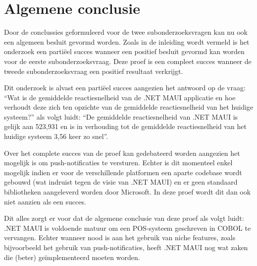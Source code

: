 \section{Algemene conclusie}
Door de conclussies geformuleerd voor de twee subonderzoeksvragen kan nu ook een algemeen besluit gevormd worden. Zoals in de inleiding wordt vermeld is het onderzoek een partiëel succes wanneer een positief besluit gevormd kan worden voor de eerste subonderzoeksvraag. Deze proef is een compleet succes wanneer de tweede subonderzoeksvraag een positief resultaat verkrijgt.

Dit onderzoek is alvast een partiëel succes aangezien het antwoord op de vraag: ``Wat is de gemiddelde reactiesnelheid van de .NET MAUI applicatie en hoe verhoudt deze zich ten opzichte van de gemiddelde reactiesnelheid van het huidige systeem?'' als volgt luidt: ``De gemiddelde reactiesnelheid van .NET MAUI is gelijk aan 523,931 en is in verhouding tot de gemiddelde reactiesnelheid van het huidige systeem 3,56 keer zo snel''.

Over het complete succes van de proef kan gedebateerd worden aangezien het mogelijk is om push-notificaties te versturen. Echter is dit momenteel enkel mogelijk indien er voor de verschillende platformen een aparte codebase wordt gebouwd (wat indruist tegen de visie van .NET MAUI) en er geen standaard bibliotheken aangeleverd worden door Microsoft. In deze proef wordt dit dan ook niet aanzien als een succes.

Dit alles zorgt er voor dat de algemene conclusie van deze proef als volgt luidt: .NET MAUI is voldoende matuur om een POS-systeem geschreven in COBOL te vervangen. Echter wanneer nood is aan het gebruik van niche features, zoals bijvoorbeeld het gebruik van push-notificaties, heeft .NET MAUI nog wat zaken die (beter) geïmplementeerd moeten worden.